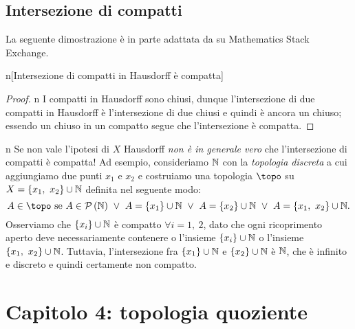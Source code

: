 \subsection{Intersezione di compatti}
La seguente dimostrazione è in parte adattata da \cite{user45861:intersectioncompact} su Mathematics Stack Exchange.
\begin{lemma}{n}[Intersezione di compatti in Hausdorff è compatta]\label{intersezione di compatti in hausdorff chiusa}
\end{lemma}
\begin{proof}{n}
	I compatti in Hausdorff sono chiusi, dunque l'intersezione di due compatti in Hausdorff è l'intersezione di due chiusi e quindi è ancora un chiuso; essendo un chiuso in un compatto segue che l'intersezione è compatta.\qedhere
\end{proof}
\begin{warning}{n}
	Se non vale l'ipotesi di $X$ Hausdorff \textit{non è in generale vero} che l'intersezione di compatti è compatta! Ad esempio, consideriamo $\mathbb{N}$ con la \textit{topologia discreta} a cui aggiungiamo due punti $x_1$ e $x_2$ e costruiamo una topologia $\topo$ su $X=\left\{x_1,\ x_2\right\}\cup\mathbb{N}$ definita nel seguente modo:
	\begin{equation*}
		A\in\topo \text{ se } A\in\powerset{\N}\ \vee\  A=\left\{x_1\right\}\cup\N\ \vee\  A=\left\{x_2\right\}\cup\N\ \vee\  A=\left\{x_1,\ x_2\right\}\cup\N.
	\end{equation*}
	Osserviamo che $\left\{x_i\right\}\cup\mathbb{N}$ è compatto $\forall i=1,\ 2$, dato che ogni ricoprimento aperto deve necessariamente contenere o l'insieme $\left\{x_i\right\}\cup\mathbb{N}$ o l'insieme $\left\{x_1,\ x_2\right\}\cup\N$. Tuttavia, l'intersezione fra $\left\{x_1\right\}\cup\mathbb{N}$ e $\left\{x_2\right\}\cup\mathbb{N}$ è $\mathbb{N}$, che è infinito e discreto e quindi certamente non compatto.
\end{warning}
\section{Capitolo 4: topologia quoziente}
